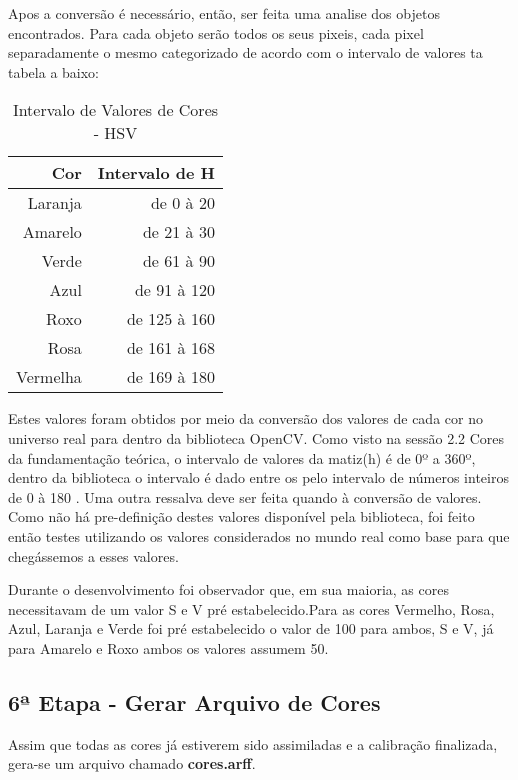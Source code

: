 Apos a conversão é necessário, então, ser feita uma analise dos objetos encontrados. Para cada objeto serão todos os seus pixeis, cada pixel separadamente o mesmo categorizado de acordo com o intervalo de valores ta tabela a baixo:

\begin{table}[H]
\centering
\begin{tabular}{r|r}
Cor & Intervalo de H \\ %
\hline                               %
Laranja & de 0 à 20 \\
\hline 
Amarelo & de 21 à 30\\
\hline 
Verde & de 61 à 90 \\
\hline 
Azul& de 91 à 120 \\
\hline 
Roxo & de 125 à 160 \\
\hline 
Rosa & de 161 à 168 \\
\hline 
Vermelha & de 169 à 180 \\
\hline 
\end{tabular}
\caption{Intervalo de Valores de Cores - HSV}
\end{table}

Estes valores foram obtidos por meio da conversão dos valores de cada cor no universo real para dentro da biblioteca OpenCV. Como visto na sessão 2.2 Cores da fundamentação teórica, o intervalo de valores da matiz(h) é de 0º a 360º, dentro da biblioteca o intervalo é dado entre os pelo intervalo de números inteiros de 0 à 180 . Uma outra ressalva deve ser feita quando à conversão de valores. Como não há pre-definição destes valores disponível pela biblioteca, foi feito então testes utilizando os valores considerados no mundo real como base para que chegássemos a esses valores.

Durante o desenvolvimento foi observador que, em sua maioria, as cores necessitavam de um valor S e V pré estabelecido.Para as cores Vermelho, Rosa, Azul, Laranja e Verde foi pré estabelecido o valor de 100 para ambos, S e V, já para Amarelo e Roxo ambos os valores assumem 50.


  \subsection{6ª Etapa - Gerar Arquivo de Cores}
  Assim que todas as cores já estiverem sido assimiladas e a calibração finalizada, gera-se um arquivo chamado \textbf{cores.arff}. 
  
  		
  
  
  

 
 

